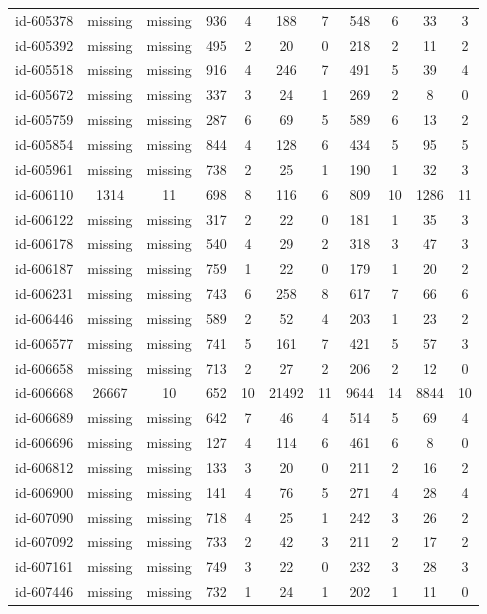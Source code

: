 \begin{tabular}{ccccccccccc}
id-605378 & missing & missing & 936 & 4 & 188 & 7 & 548 & 6 & 33 & 3\\
id-605392 & missing & missing & 495 & 2 & 20 & 0 & 218 & 2 & 11 & 2\\
id-605518 & missing & missing & 916 & 4 & 246 & 7 & 491 & 5 & 39 & 4\\
id-605672 & missing & missing & 337 & 3 & 24 & 1 & 269 & 2 & 8 & 0\\
id-605759 & missing & missing & 287 & 6 & 69 & 5 & 589 & 6 & 13 & 2\\
id-605854 & missing & missing & 844 & 4 & 128 & 6 & 434 & 5 & 95 & 5\\
id-605961 & missing & missing & 738 & 2 & 25 & 1 & 190 & 1 & 32 & 3\\
id-606110 & 1314 & 11 & 698 & 8 & 116 & 6 & 809 & 10 & 1286 & 11\\
id-606122 & missing & missing & 317 & 2 & 22 & 0 & 181 & 1 & 35 & 3\\
id-606178 & missing & missing & 540 & 4 & 29 & 2 & 318 & 3 & 47 & 3\\
id-606187 & missing & missing & 759 & 1 & 22 & 0 & 179 & 1 & 20 & 2\\
id-606231 & missing & missing & 743 & 6 & 258 & 8 & 617 & 7 & 66 & 6\\
id-606446 & missing & missing & 589 & 2 & 52 & 4 & 203 & 1 & 23 & 2\\
id-606577 & missing & missing & 741 & 5 & 161 & 7 & 421 & 5 & 57 & 3\\
id-606658 & missing & missing & 713 & 2 & 27 & 2 & 206 & 2 & 12 & 0\\
id-606668 & 26667 & 10 & 652 & 10 & 21492 & 11 & 9644 & 14 & 8844 & 10\\
id-606689 & missing & missing & 642 & 7 & 46 & 4 & 514 & 5 & 69 & 4\\
id-606696 & missing & missing & 127 & 4 & 114 & 6 & 461 & 6 & 8 & 0\\
id-606812 & missing & missing & 133 & 3 & 20 & 0 & 211 & 2 & 16 & 2\\
id-606900 & missing & missing & 141 & 4 & 76 & 5 & 271 & 4 & 28 & 4\\
id-607090 & missing & missing & 718 & 4 & 25 & 1 & 242 & 3 & 26 & 2\\
id-607092 & missing & missing & 733 & 2 & 42 & 3 & 211 & 2 & 17 & 2\\
id-607161 & missing & missing & 749 & 3 & 22 & 0 & 232 & 3 & 28 & 3\\
id-607446 & missing & missing & 732 & 1 & 24 & 1 & 202 & 1 & 11 & 0\\

\end{tabular}
